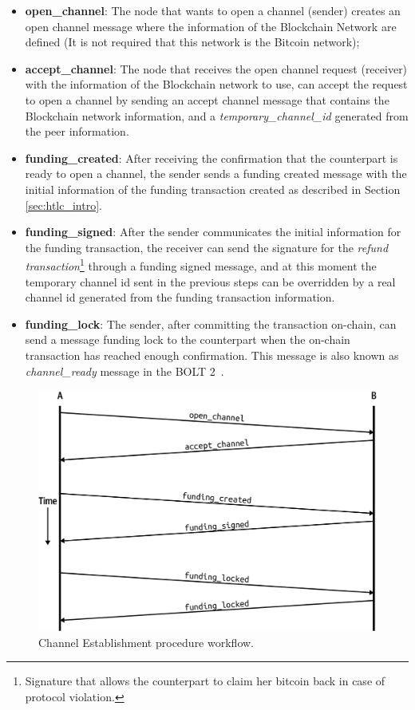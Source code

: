 \begin{itemize}
  \item {\bf open\_channel}: The node that wants to open a channel (sender) creates an open channel message where the information of the
        Blockchain Network are defined (It is not required that this network is the Bitcoin network);
  \item {\bf accept\_channel}: The node that receives the open channel request (receiver) with the information of the Blockchain network to use,
        can accept the request to open a channel by sending an accept channel message that contains the Blockchain network information, and
        a \emph{temporary\_channel\_id} generated from the peer information.
  \item {\bf funding\_created}: After receiving the confirmation that the counterpart is ready to open a channel, the sender
        sends a funding created message with the initial information of the funding transaction created as described in Section \ref{sec:htlc_intro}.
  \item {\bf funding\_signed}: After the sender communicates the initial information for the funding transaction, the
        receiver can send the signature for the \emph{refund transaction}\footnote{Signature that allows the counterpart to claim her bitcoin back in case of protocol violation.} through a funding signed message, and at this moment the temporary
        channel id sent in the previous steps can be overridden by a real channel id generated from the funding transaction information.
  \item {\bf funding\_lock}: The sender, after committing the transaction on-chain, can send a message funding lock to the counterpart when
        the on-chain transaction has reached enough confirmation. This message is also known as \emph{channel\_ready} message in the BOLT 2~\cite{bolt2}.
\end{itemize}

\begin{figure}[h]
  \begin{center}
  \includegraphics[width=0.6\columnwidth]{imgs/mtln_0703.png}
  \end{center}
    \caption{Channel Establishment procedure workflow.~\cite{lnbook}}
  \label{fig:channel-establishment}
\end{figure}

